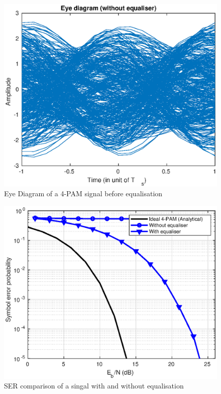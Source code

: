 \begin{figure}[H]
    \begin{center}
        \includegraphics{Equaliser/eye}
    \end{center}
    \caption{Eye Diagram of a 4-PAM signal before equalisation}
    \label{fig:equ-eye}
\end{figure}

\begin{figure}[H]
    \begin{center}
        \includegraphics{Equaliser/ber}
    \end{center}
    \caption{SER comparison of a singal with and without equalisation}
    \label{fig:equ-ser}
\end{figure}

